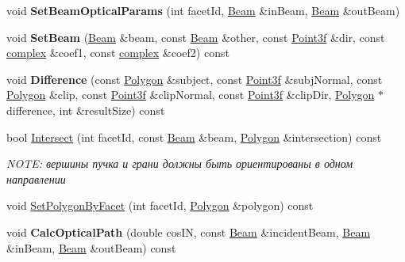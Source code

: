 \begin{DoxyCompactItemize}
\item 
\mbox{\label{class_tracing_aec003fe5ec76d682820343d140bad9ac}} 
void {\bfseries Set\+Beam\+Optical\+Params} (int facet\+Id, \mbox{\hyperlink{class_beam}{Beam}} \&in\+Beam, \mbox{\hyperlink{class_beam}{Beam}} \&out\+Beam)
\item 
\mbox{\label{class_tracing_a978af0f403e8cc7a9bfd356765f9bb48}} 
void {\bfseries Set\+Beam} (\mbox{\hyperlink{class_beam}{Beam}} \&beam, const \mbox{\hyperlink{class_beam}{Beam}} \&other, const \mbox{\hyperlink{struct_point3f}{Point3f}} \&dir, const \mbox{\hyperlink{classcomplex}{complex}} \&coef1, const \mbox{\hyperlink{classcomplex}{complex}} \&coef2) const
\item 
\mbox{\label{class_tracing_a99dc46565a81fbedc5bfdcd252e310d3}} 
void {\bfseries Difference} (const \mbox{\hyperlink{class_polygon}{Polygon}} \&subject, const \mbox{\hyperlink{struct_point3f}{Point3f}} \&subj\+Normal, const \mbox{\hyperlink{class_polygon}{Polygon}} \&clip, const \mbox{\hyperlink{struct_point3f}{Point3f}} \&clip\+Normal, const \mbox{\hyperlink{struct_point3f}{Point3f}} \&clip\+Dir, \mbox{\hyperlink{class_polygon}{Polygon}} $\ast$difference, int \&result\+Size) const
\item 
\mbox{\label{class_tracing_a257f8200eaf682dac765d100391c5d1e}} 
bool \mbox{\hyperlink{class_tracing_a257f8200eaf682dac765d100391c5d1e}{Intersect}} (int facet\+Id, const \mbox{\hyperlink{class_beam}{Beam}} \&beam, \mbox{\hyperlink{class_polygon}{Polygon}} \&intersection) const
\begin{DoxyCompactList}\small\item\em N\+O\+TE\+: вершины пучка и грани должны быть ориентированы в одном направлении \end{DoxyCompactList}\item 
void \mbox{\hyperlink{class_tracing_a6968bb9a769fc44e191355d70c0cf56e}{Set\+Polygon\+By\+Facet}} (int facet\+Id, \mbox{\hyperlink{class_polygon}{Polygon}} \&polygon) const
\item 
\mbox{\label{class_tracing_a8d31b476a030d623e9d2390e97af7028}} 
void {\bfseries Calc\+Optical\+Path} (double cos\+IN, const \mbox{\hyperlink{class_beam}{Beam}} \&incident\+Beam, \mbox{\hyperlink{class_beam}{Beam}} \&in\+Beam, \mbox{\hyperlink{class_beam}{Beam}} \&out\+Beam) const

\end{DoxyCompactItemize}
